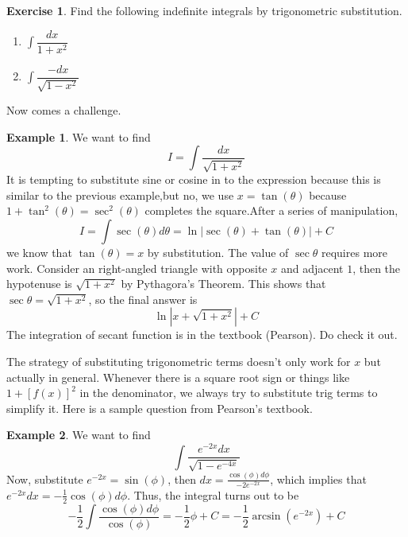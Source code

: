 \documentclass{article}
\theoremstyle{definition}
\theoremstyle{definition}
\theoremstyle{definition}
\theoremstyle{definition}
\theoremstyle{definition}
\theoremstyle{definition}
\newtheorem{example}{Example}
\theoremstyle{definition}
\theoremstyle{definition}
\theoremstyle{definition}
\newtheorem{exercise}{Exercise}
\begin{document}
\begin{exercise}
Find the following indefinite integrals by trigonometric substitution.
\begin{enumerate}
	\item $\int \dfrac{dx}{1+x^2}$
	\item $\int \dfrac{-dx}{\sqrt{1-x^2}}$
\end{enumerate}
\end{exercise}

Now comes a challenge.
\begin{example}
We want to find \[I=\int \dfrac{dx}{\sqrt{1+x^2}}\]
It is tempting to substitute sine or cosine in to the expression because this is similar to the previous example,but no, we use $x=\tan(\theta)$ because $1+\tan^2(\theta)=\sec^2(\theta)$ completes the square.After a series of manipulation,
\[
I=\int\sec(\theta)d\theta=\ln|\sec(\theta)+\tan(\theta)|+C
\]
we know that $\tan(\theta)=x$ by substitution. The value of $\sec\theta$ requires more work.
Consider an right-angled triangle with opposite $x$ and adjacent $1$, then the hypotenuse is $\sqrt{1+x^2}$ by Pythagora's Theorem.
This shows that $\sec\theta=\sqrt{1+x^2}$, so the final answer is
\[\ln|x+\sqrt{1+x^2}|+C\]
The integration of secant function is in the textbook (Pearson). Do check it out.
\end{example}

The strategy of substituting trigonometric terms doesn't only work for $x$ but actually in general. Whenever there is a square root sign or things like $1+[f(x)]^2$ in the denominator, we always try to substitute trig terms to simplify it. Here is a sample question from Pearson's textbook.
\begin{example}
We want to find \[ \int \dfrac{e^{-2x}dx}{\sqrt{1-e^{-4x}}}\]
Now, substitute $e^{-2x}=\sin(\phi)$, then $dx=\frac{\cos(\phi)d\phi}{-2e^{-2x}}$, which implies that $e^{-2x}dx=-\frac{1}{2}\cos(\phi)d\phi$. Thus, the integral turns out to be
\[
-\dfrac{1}{2}\int\dfrac{\cos(\phi)d\phi}{\cos(\phi)}=-\dfrac{1}{2}\phi+C=-\dfrac{1}{2}\arcsin(e^{-2x})+C
\]
\end{example}
\end{document}
